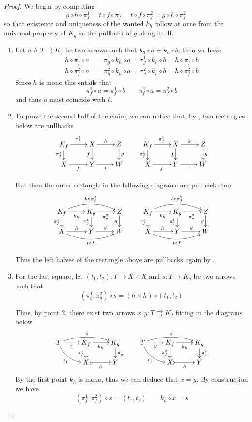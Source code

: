 \documentclass[a4paper,UKenglish,cleveref,pdftex,amsthm,thm-restate,numberwithinsect]{cas-sc}
\theoremstyle{plain}
\theoremstyle{definition}
\begin{document}
\kpp*
\begin{proof}\label{kpp-proof}
	We begin by computing 
	\[g \circ h \circ \pi_f^1 =  t \circ f \circ \pi_f^1     =  t \circ f \circ \pi_f^2     =  g \circ h \circ \pi_f^2\]
	so that  existence  and uniqueness of the wanted $k_h$ follow at once from the universal property of $K_g$ as the pullback of $g$ along itself.
	
	
	\begin{enumerate}
		\item Let $a,b\colon T\rightrightarrows K_f$ be two arrows such that $k_h\circ a=k_h\circ b$, then we have
\begin{align*}h\circ \pi^1_f\circ a&=\pi^1_g\circ k_h\circ a=\pi^1_g\circ k_h\circ b=h\circ \pi^1_f\circ b\\
	h\circ \pi^2_f\circ a&=\pi^2_g\circ k_h\circ a=\pi^2_g\circ k_h\circ b=h\circ \pi^2_f\circ b
\end{align*}
Since $h$ is mono this entails that
\[	\pi^1_f\circ a=\pi^1_f\circ b \qquad \pi^2_f\circ a=\pi^2_f\circ b\]
and thus $a$ must coincide with $b$.
 
 		\item  
		To prove the second half of the claim, we can notice that, by ,  two rectangles below are pullbacks
		\[\xymatrix@R=15pt{K_f \ar[r]^{\pi^2_f} \ar[d]_{\pi^1_f} & X \ar[r]^{h} \ar[d]_{f} & Z \ar[d]^{g} &  K_f \ar[r]^{\pi^1_f} \ar[d]_{\pi^2_f} & X \ar[r]^{h} \ar[d]_{f} & Z \ar[d]^{g}\\
			X \ar[r]_{f}& Y \ar[r]_{t} & W & X \ar[r]_{f} & Y  \ar[r]_{t}& W}\]
		
		But then the outer rectangle in the  following diagrams are pullbacks too
		\[\xymatrix@R=15pt{	K_f  \ar@/^.4cm/[rr]^{h\circ\pi^2_f}\ar[r]_{k_h} \ar[d]_{\pi^1_f}& K_g \ar[d]_{\pi^1_g}  \ar[r]_{\pi^2_g}& Z \ar[d]_{g} & K_f  \ar@/^.4cm/[rr]^{h\circ\pi^2_f}\ar[r]_{k_h} \ar[d]_{\pi^1_f}& K_g \ar[d]_{\pi^1_g}  \ar[r]_{\pi^2_g}& Z \ar[d]_{g} \\
			X \ar[r]^{h} \ar@/_.4cm/[rr]_{t\circ f}& Y \ar[r]^{g} & W & X \ar[r]^{h} \ar@/_.4cm/[rr]_{t\circ f}& Y \ar[r]^{g} & W}\]
		
		Thus the left halves of the rectangle above are pullbacks again by .   
	
		
		\item 		For the last square, let $(t_1, t_2)\colon T\to X\times X$ and $s\colon T\to K_g$ be two arrows such that
		\[(\pi^1_g, \pi^2_g)\circ s=(h\times h)\circ (t_1, t_2)\]
		
		Thus, by point $2$, there exist two arrows $x, y\colon T\rightrightarrows K_f$ fitting in the diagrams below
		\[\xymatrix@R=15pt{T\ar@{.>}[r]_-{x} \ar@/^.3cm/[rr]^{s} \ar@/_.3cm/[dr]_{t_1}& K_f \ar@{->}[r]_{k_h} \ar[d]_{\pi^1_f} & K_g \ar[d]^{\pi^1_g} & T \ar@{.>}[r]_-{y} \ar@/^.3cm/[rr]^{s} \ar@/_.3cm/[dr]_{t_2} & K_f  \ar@{->}[r]_{k_h} \ar[d]_{\pi^2_f}& K_g \ar[d]^{\pi^2_g}\\ & X \ar@{>->}[r]_{h} & Y &&X \ar@{>->}[r]_{h}& Y} \]
		By the first point $k_h$ is mono, thus we can deduce that $x=y$. By construction we have
		\[(\pi^1_f, \pi^2_f)\circ x=(t_1, t_2) \qquad k_h\circ x=s\] 
				

\end{enumerate}
\end{proof}
\end{document}
